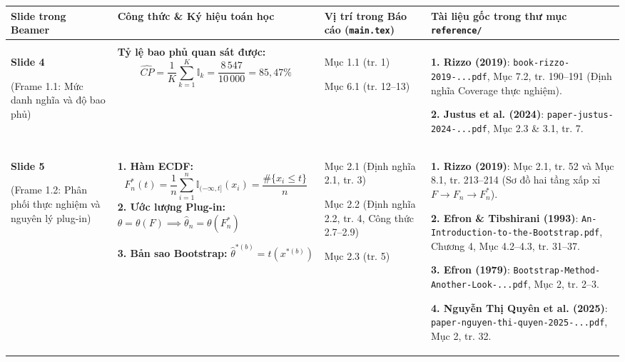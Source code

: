 \documentclass[10pt,a4paper]{article}
\begin{document}
\small
\renewcommand{\arraystretch}{1.3}
\setlength{\tabcolsep}{5pt}
\begin{longtable}{|>{\RaggedRight\arraybackslash}p{2.1cm}|>{\RaggedRight\arraybackslash}p{5.1cm}|>{\RaggedRight\arraybackslash}p{3.1cm}|>{\RaggedRight\arraybackslash}p{6.3cm}|}
\hline
\rowcolor{headerbg}
\textbf{Slide trong Beamer} & \textbf{Công thức \& Ký hiệu toán học} & \textbf{Vị trí trong Báo cáo (\texttt{main.tex})} & \textbf{Tài liệu gốc trong thư mục \texttt{reference/}} \\
\hline
\endhead

\hline
\multicolumn{4}{|r|}{\footnotesize\itshape Tiếp tục ở trang sau...} \\
\hline
\endfoot

\hline
\endlastfoot

\textbf{Slide 4}\par(Frame 1.1: Mức danh nghĩa và độ bao phủ) &
\textbf{Tỷ lệ bao phủ quan sát được:}
\[
\widehat{CP} = \frac{1}{K}\sum_{k=1}^K \mathbb{I}_k = \frac{8\,547}{10\,000} = 85{,}47\%
\] &
Mục 1.1 (tr. 1)\par
Mục 6.1 (tr. 12--13) &
\textbf{1. Rizzo (2019)}: \texttt{book-rizzo-2019-...pdf}, Mục 7.2, tr. 190--191 (Định nghĩa Coverage thực nghiệm).\par
\textbf{2. Justus et al. (2024)}: \texttt{paper-justus-2024-...pdf}, Mục 2.3 \& 3.1, tr. 7. \\
\hline

\textbf{Slide 5}\par(Frame 1.2: Phân phối thực nghiệm và nguyên lý plug-in) &
\textbf{1. Hàm ECDF:}
\[
F_n^*(t) = \frac{1}{n}\sum_{i=1}^n \mathbb{I}_{(-\infty,t]}(x_i) = \frac{\#\{x_i\le t\}}{n}
\]
\textbf{2. Ước lượng Plug-in:}
$\theta = \theta(F) \implies \hat\theta_n = \theta(F_n^*)$\par
\textbf{3. Bản sao Bootstrap:}
$\hat\theta^{*(b)} = t(x^{*(b)})$ &
Mục 2.1 (Định nghĩa 2.1, tr. 3)\par
Mục 2.2 (Định nghĩa 2.2, tr. 4, Công thức 2.7--2.9)\par
Mục 2.3 (tr. 5) &
\textbf{1. Rizzo (2019)}: Mục 2.1, tr. 52 và Mục 8.1, tr. 213--214 (Sơ đồ hai tầng xấp xỉ $F \to F_n \to F_n^*$).\par
\textbf{2. Efron \& Tibshirani (1993)}: \texttt{An-Introduction-to-the-Bootstrap.pdf}, Chương 4, Mục 4.2--4.3, tr. 31--37.\par
\textbf{3. Efron (1979)}: \texttt{Bootstrap-Method-Another-Look-...pdf}, Mục 2, tr. 2--3.\par
\textbf{4. Nguyễn Thị Quyên et al. (2025)}: \texttt{paper-nguyen-thi-quyen-2025-...pdf}, Mục 2, tr. 32. \\
\hline


\end{longtable}
\end{document}
